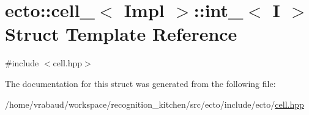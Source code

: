\hypertarget{structecto_1_1cell___1_1int__}{}\section{ecto\+:\+:cell\+\_\+$<$ Impl $>$\+:\+:int\+\_\+$<$ I $>$ Struct Template Reference}
\label{structecto_1_1cell___1_1int__}


{\ttfamily \#include $<$cell.\+hpp$>$}



The documentation for this struct was generated from the following file\+:\begin{DoxyCompactItemize}
\item 
/home/vrabaud/workspace/recognition\+\_\+kitchen/src/ecto/include/ecto/\hyperlink{cell_8hpp}{cell.\+hpp}\end{DoxyCompactItemize}
